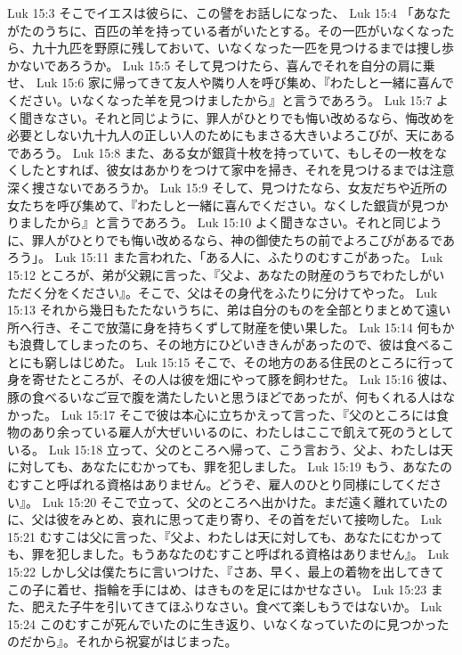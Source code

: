 Luk 15:3  そこでイエスは彼らに、この譬をお話しになった、
Luk 15:4  「あなたがたのうちに、百匹の羊を持っている者がいたとする。その一匹がいなくなったら、九十九匹を野原に残しておいて、いなくなった一匹を見つけるまでは捜し歩かないであろうか。
Luk 15:5  そして見つけたら、喜んでそれを自分の肩に乗せ、
Luk 15:6  家に帰ってきて友人や隣り人を呼び集め、『わたしと一緒に喜んでください。いなくなった羊を見つけましたから』と言うであろう。
Luk 15:7  よく聞きなさい。それと同じように、罪人がひとりでも悔い改めるなら、悔改めを必要としない九十九人の正しい人のためにもまさる大きいよろこびが、天にあるであろう。
Luk 15:8  また、ある女が銀貨十枚を持っていて、もしその一枚をなくしたとすれば、彼女はあかりをつけて家中を掃き、それを見つけるまでは注意深く捜さないであろうか。
Luk 15:9  そして、見つけたなら、女友だちや近所の女たちを呼び集めて、『わたしと一緒に喜んでください。なくした銀貨が見つかりましたから』と言うであろう。
Luk 15:10  よく聞きなさい。それと同じように、罪人がひとりでも悔い改めるなら、神の御使たちの前でよろこびがあるであろう」。
Luk 15:11  また言われた、「ある人に、ふたりのむすこがあった。
Luk 15:12  ところが、弟が父親に言った、『父よ、あなたの財産のうちでわたしがいただく分をください』。そこで、父はその身代をふたりに分けてやった。
Luk 15:13  それから幾日もたたないうちに、弟は自分のものを全部とりまとめて遠い所へ行き、そこで放蕩に身を持ちくずして財産を使い果した。
Luk 15:14  何もかも浪費してしまったのち、その地方にひどいききんがあったので、彼は食べることにも窮しはじめた。
Luk 15:15  そこで、その地方のある住民のところに行って身を寄せたところが、その人は彼を畑にやって豚を飼わせた。
Luk 15:16  彼は、豚の食べるいなご豆で腹を満たしたいと思うほどであったが、何もくれる人はなかった。
Luk 15:17  そこで彼は本心に立ちかえって言った、『父のところには食物のあり余っている雇人が大ぜいいるのに、わたしはここで飢えて死のうとしている。
Luk 15:18  立って、父のところへ帰って、こう言おう、父よ、わたしは天に対しても、あなたにむかっても、罪を犯しました。
Luk 15:19  もう、あなたのむすこと呼ばれる資格はありません。どうぞ、雇人のひとり同様にしてください』。
Luk 15:20  そこで立って、父のところへ出かけた。まだ遠く離れていたのに、父は彼をみとめ、哀れに思って走り寄り、その首をだいて接吻した。
Luk 15:21  むすこは父に言った、『父よ、わたしは天に対しても、あなたにむかっても、罪を犯しました。もうあなたのむすこと呼ばれる資格はありません』。
Luk 15:22  しかし父は僕たちに言いつけた、『さあ、早く、最上の着物を出してきてこの子に着せ、指輪を手にはめ、はきものを足にはかせなさい。
Luk 15:23  また、肥えた子牛を引いてきてほふりなさい。食べて楽しもうではないか。
Luk 15:24  このむすこが死んでいたのに生き返り、いなくなっていたのに見つかったのだから』。それから祝宴がはじまった。
